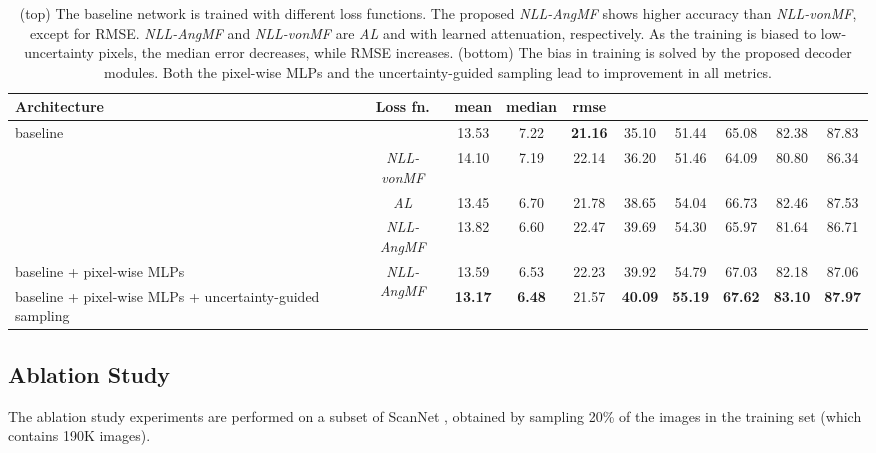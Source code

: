 \documentclass[10pt,twocolumn,letterpaper]{article}
\begin{document}
\begin{table*}[t]
\setlength\tabcolsep{1.5pt}
\begin{center}
\begin{tabular}{l|c|ccc|ccccc}
\hline
\toprule
Architecture & Loss fn. & mean & median & rmse &  &  &  &  &  \\
\midrule
\multirow{3}{*}{\small baseline} & {\small }
& 13.53 & 7.22 & \textbf{21.16} & 35.10 & 51.44 & 65.08 & 82.38 & 87.83\\
\multirow{3}{*}{\small (convolutional encoder-decoder with skip connections \cite{adabins})} & {\small \textit{NLL-vonMF}} & 14.10 & 7.19 & 22.14 & 36.20 & 51.46 & 64.09 & 80.80 & 86.34\\
\cline{2-10}
& {\small \textit{AL}} & 13.45 & 6.70 & 21.78 & 38.65 & 54.04 & 66.73 & 82.46 & 87.53\\
& {\small \textit{NLL-AngMF}} & 13.82 & 6.60 & 22.47 & 39.69 & 54.30 & 65.97 & 81.64 & 86.71 \\
\hline
\hline
{\small baseline + pixel-wise MLPs} & \multirow{2}{*}{\small \textit{NLL-AngMF}} & 13.59 & 6.53 & 22.23 & 39.92 & 54.79 & 67.03 & 82.18 & 87.06 \\
{\small baseline + pixel-wise MLPs + uncertainty-guided sampling} & & 
\textbf{13.17} & \textbf{6.48} & 21.57 & \textbf{40.09} & \textbf{55.19} & \textbf{67.62} & \textbf{83.10} & \textbf{87.97} \\
\bottomrule
\end{tabular}
\end{center}
\caption{(top) The baseline network is trained with different loss functions. The proposed \textit{NLL-AngMF} shows higher accuracy than \textit{NLL-vonMF}, except for RMSE. \textit{NLL-AngMF} and \textit{NLL-vonMF} are \textit{AL} and  with learned attenuation, respectively. As the training is biased to low-uncertainty pixels, the median error decreases, while RMSE increases. (bottom) The bias in training is solved by the proposed decoder modules. Both the pixel-wise MLPs and the uncertainty-guided sampling lead to improvement in all metrics.}
\label{table:ablation1}
\end{table*}

\subsection{Ablation Study}

The ablation study experiments are performed on a subset of ScanNet \cite{ScanNet}, obtained by sampling 20\% of the images in the training set (which contains 190K images).
\end{document}

